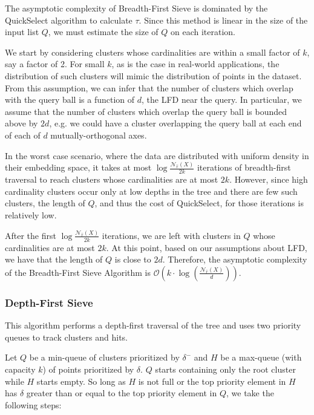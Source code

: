 The asymptotic complexity of Breadth-First Sieve is dominated by the QuickSelect algorithm to calculate $\tau$.
Since this method is linear in the size of the input list $Q$, we must estimate the size of $Q$ on each iteration. 

We start by considering clusters whose cardinalities are within a small factor of $k$, say a factor of 2.
For small $k$, as is the case in real-world applications, the distribution of such clusters will mimic the distribution of points in the dataset.
From this assumption, we can infer that the number of clusters which overlap with the query ball is a function of $d$, the LFD near the query.
In particular, we assume that the number of clusters which overlap the query ball is bounded above by $2d$, e.g. we could have a cluster overlapping the query ball at each end of each of $d$ mutually-orthogonal axes.

In the worst case scenario, where the data are distributed with uniform density in their embedding space, it takes at most $\log{\frac{\mathcal{N}_{\hat{r}}(X)}{2k}}$ iterations of breadth-first traversal to reach clusters whose cardinalities are at most $2k$.
However, since high cardinality clusters occur only at low depths in the tree and there are few such clusters, the length of $Q$, and thus the cost of QuickSelect, for those iterations is relatively low.

After the first $\log{\frac{\mathcal{N}_{\hat{r}}(X)}{2k}}$ iterations, we are left with clusters in $Q$ whose cardinalities are at most $2k$.
At this point, based on our assumptions about LFD, we have that the length of $Q$ is close to $2d$.
Therefore, the asymptotic complexity of the Breadth-First Sieve Algorithm is $\mathcal{O} \left( k \cdot \log(\frac{\mathcal{N}_{\hat{r}}(X)}{d}) \right)$.


\subsubsection{Depth-First Sieve}
\label{sec:methods:knn-search:depth-first-sieve}

This algorithm performs a depth-first traversal of the tree and uses two priority queues to track clusters and hits.

Let $Q$ be a min-queue of clusters prioritized by $\delta^{-}$ and $H$ be a max-queue (with capacity $k$) of points prioritized by $\delta$.
$Q$ starts containing only the root cluster while $H$ starts empty.
So long as $H$ is not full or the top priority element in $H$ has $\delta$ greater than or equal to the top priority element in $Q$, we take the following steps:

